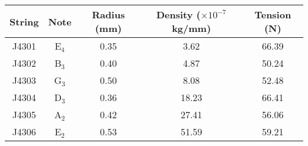 \begin{tabular}{ccccc}
\toprule
String &    Note &  Radius (mm) &  Density ($\times 10^{-7}$ kg/mm) &  Tension (N) \\
\midrule
 J4301 & E$_{4}$ &         0.35 &                              3.62 &        66.39 \\
 J4302 & B$_{3}$ &         0.40 &                              4.87 &        50.24 \\
 J4303 & G$_{3}$ &         0.50 &                              8.08 &        52.48 \\
 J4304 & D$_{3}$ &         0.36 &                             18.23 &        66.41 \\
 J4305 & A$_{2}$ &         0.42 &                             27.41 &        56.06 \\
 J4306 & E$_{2}$ &         0.53 &                             51.59 &        59.21 \\
\bottomrule
\end{tabular}


